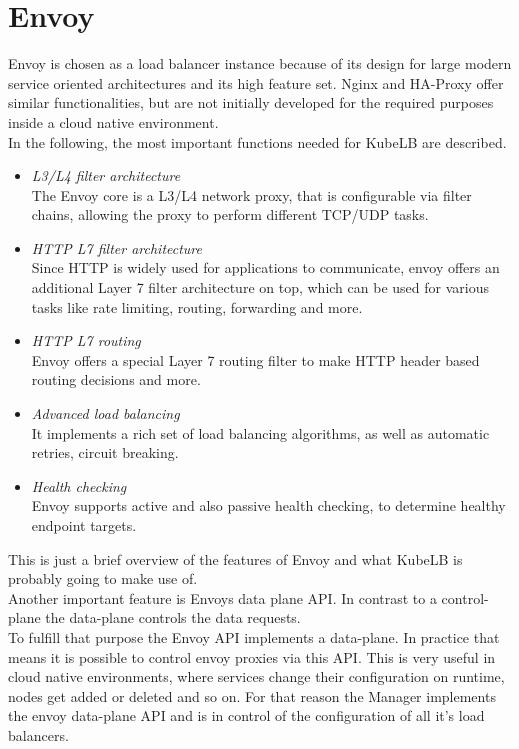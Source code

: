 \section{Envoy}\label{sec:envoy}

Envoy is chosen as a load balancer instance because of its design for large modern service oriented architectures and its high feature set.
Nginx and HA-Proxy offer similar functionalities, but are not initially developed for the required purposes inside a cloud native environment.
\\
In the following, the most important functions needed for KubeLB are described.

\begin{itemize}
    \item \textit{L3/L4 filter architecture} \\
    The Envoy core is a L3/L4 network proxy, that is configurable via filter chains, allowing the proxy to perform different TCP/UDP tasks.
    \item \textit{HTTP L7 filter architecture} \\
    Since HTTP is widely used for applications to communicate, envoy offers an additional Layer 7 filter architecture on top, which can be used for various tasks like rate limiting, routing, forwarding and more.
    \item \textit{HTTP L7 routing} \\
    Envoy offers a special Layer 7 routing filter to make HTTP header based routing decisions and more.
    \item \textit{Advanced load balancing} \\
    It implements a rich set of load balancing algorithms, as well as automatic retries, circuit breaking.
    \item \textit{Health checking} \\
    Envoy supports active and also passive health checking, to determine healthy endpoint targets.
\end{itemize}

This is just a brief overview of the features of Envoy and what KubeLB is probably going to make use of.~\cite{WHAT-IS-ENVOY}
\\
Another important feature is Envoys data plane API.
In contrast to a control-plane the data-plane controls the data requests.
\\
To fulfill that purpose the Envoy API implements a data-plane.
In practice that means it is possible to control envoy proxies via this API.
This is very useful in cloud native environments, where services change their configuration on runtime, nodes get added or deleted and so on.
For that reason the Manager implements the envoy data-plane API and is in control of the configuration of all it's load balancers.
